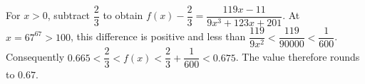 For $x>0$, subtract $\dfrac{2}{3}$ to obtain $f(x)-\dfrac{2}{3}=\dfrac{119x-11}{9x^3+123x+201}$. At $x=67^{67}>100$, this difference is positive and less than $\dfrac{119}{9x^2}<\dfrac{119}{90000}<\dfrac{1}{600}$. Consequently $0.665<\dfrac{2}{3}<f(x)<\dfrac{2}{3}+\dfrac{1}{600}<0.675$. The value therefore rounds to $\boxed{0.67}$.
